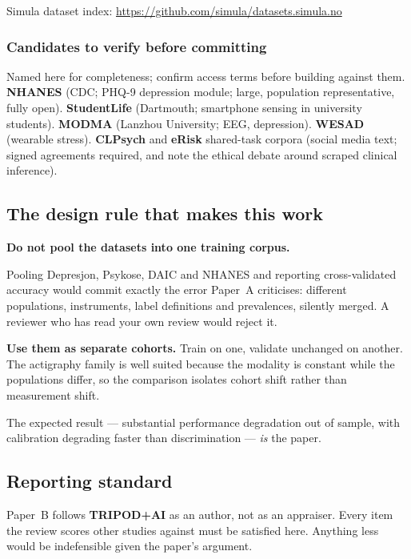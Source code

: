 \documentclass[11pt,a4paper]{article}
\begin{document}
\smallskip
Simula dataset index: \url{https://github.com/simula/datasets.simula.no}

\subsubsection*{Candidates to verify before committing}

Named here for completeness; confirm access terms before building against
them. \textbf{NHANES} (CDC; PHQ-9 depression module; large, population
representative, fully open). \textbf{StudentLife} (Dartmouth; smartphone
sensing in university students). \textbf{MODMA} (Lanzhou University; EEG,
depression). \textbf{WESAD} (wearable stress). \textbf{CLPsych} and
\textbf{eRisk} shared-task corpora (social media text; signed agreements
required, and note the ethical debate around scraped clinical inference).

\subsection{The design rule that makes this work}

\begin{keybox}
\textbf{Do not pool the datasets into one training corpus.}

\smallskip
Pooling Depresjon, Psykose, DAIC and NHANES and reporting cross-validated
accuracy would commit exactly the error Paper~A criticises: different
populations, instruments, label definitions and prevalences, silently merged.
A reviewer who has read your own review would reject it.

\smallskip
\textbf{Use them as separate cohorts.} Train on one, validate unchanged on
another. The actigraphy family is well suited because the modality is
constant while the populations differ, so the comparison isolates cohort
shift rather than measurement shift.

\smallskip
The expected result --- substantial performance degradation out of sample,
with calibration degrading faster than discrimination --- \emph{is} the
paper.
\end{keybox}

\subsection{Reporting standard}

Paper~B follows \textbf{TRIPOD+AI} as an author, not as an appraiser. Every
item the review scores other studies against must be satisfied here. Anything
less would be indefensible given the paper's argument.
\end{document}
